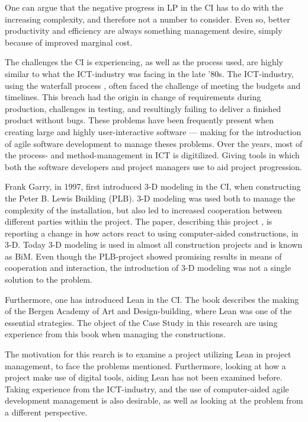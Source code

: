 One can argue that the negative progress in LP in the CI has to do with the increasing complexity, and therefore not a number to consider. Even so, better productivity and efficiency are always something management desire, simply because of improved marginal cost.

The challenges the CI is experiencing, as well as the process used, are highly similar to what the ICT-industry was facing in the late '80s. The ICT-industry, using the waterfall process \cite{royce}, often faced the challenge of meeting the budgets and timelines. This breach had the origin in change of requirements during production, challenges in testing, and resultingly failing to deliver a finished product without bugs. These problems have been frequently present when creating large and highly user-interactive software — making for the introduction of agile software development to manage theses problems. Over the years, most of the process- and method-management in ICT is digitilized. Giving tools in which both the software developers and project managers use to aid project progression.  

Frank Garry, in 1997, first introduced 3-D modeling in the CI, when constructing the Peter B. Lewis Building (PLB). 3-D modeling was used both to manage the complexity of the installation, but also led to increased cooperation between different parties within the project. The paper, describing this project \cite{frank_garry}, is reporting a change in how actors react to using computer-aided constructions, in 3-D. Today 3-D modeling is used in almost all construction projects and is known as BiM. Even though the PLB-project showed promising results in means of cooperation and interaction, the introduction of 3-D modeling was not a single solution to the problem.

Furthermore, one has introduced Lean in the CI. The book \cite{lean_i_praksis} describes the making of the Bergen Academy of Art and Design-building, where Lean was one of the essential strategies. The object of the Case Study in this research are using experience from this book when managing the constructions. 

The motivation for this rearch is to examine a project utilizing Lean in project management, to face the problems mentioned. Furthermore, looking at how a project make use of digital tools, aiding Lean has not been examined before. Taking experience from the ICT-industry, and the use of computer-aided agile development management is also desirable, as well as looking at the problem from a different perspective.

